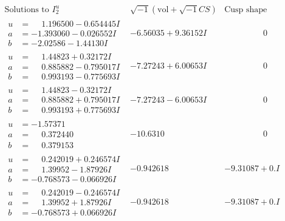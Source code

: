 \documentclass[1p]{elsarticle_modified}
\theoremstyle{definition}
\newcommand{\I}{\sqrt{-1}}
\begin{document}
$$\begin{array}{c|c|c}
\text{Solutions to }I^u_{2}& \I (\text{vol} + \sqrt{-1}CS) & \text{Cusp shape}\\
 \hline 
\begin{aligned}
u &= \phantom{-}1.196500 - 0.654445 I \\
a &= -1.393060 - 0.026552 I \\
b &= -2.02586 - 1.44130 I\end{aligned}
 & -6.56035 + 9.36152 I & \phantom{-0.000000 } 0 \\ \hline\begin{aligned}
u &= \phantom{-}1.44823 + 0.32172 I \\
a &= \phantom{-}0.885882 - 0.795017 I \\
b &= \phantom{-}0.993193 - 0.775693 I\end{aligned}
 & -7.27243 + 6.00653 I & \phantom{-0.000000 } 0 \\ \hline\begin{aligned}
u &= \phantom{-}1.44823 - 0.32172 I \\
a &= \phantom{-}0.885882 + 0.795017 I \\
b &= \phantom{-}0.993193 + 0.775693 I\end{aligned}
 & -7.27243 - 6.00653 I & \phantom{-0.000000 } 0 \\ \hline\begin{aligned}
u &= -1.57371\phantom{ +0.000000I} \\
a &= \phantom{-}0.372440\phantom{ +0.000000I} \\
b &= \phantom{-}0.379153\phantom{ +0.000000I}\end{aligned}
 & -10.6310\phantom{ +0.000000I} & \phantom{-0.000000 } 0 \\ \hline\begin{aligned}
u &= \phantom{-}0.242019 + 0.246574 I \\
a &= \phantom{-}1.39952 - 1.87926 I \\
b &= -0.768573 - 0.066926 I\end{aligned}
 & -0.942618\phantom{ +0.000000I} & -9.31087 + 0. I\phantom{ +0.000000I} \\ \hline\begin{aligned}
u &= \phantom{-}0.242019 - 0.246574 I \\
a &= \phantom{-}1.39952 + 1.87926 I \\
b &= -0.768573 + 0.066926 I\end{aligned}
 & -0.942618\phantom{ +0.000000I} & -9.31087 + 0. I\phantom{ +0.000000I} \\ \hline\begin{aligned}

\end{aligned}
\end{array}$$
\end{document}
